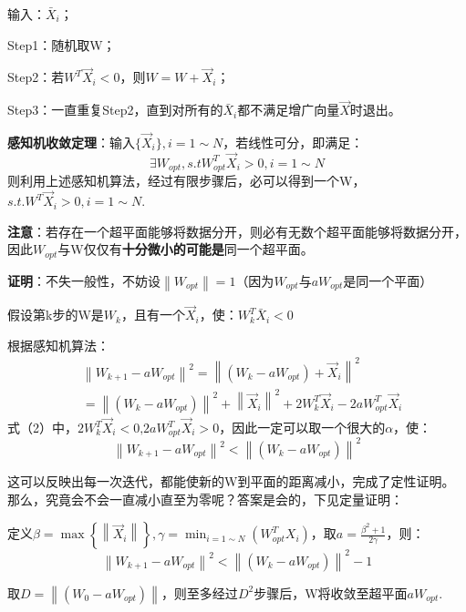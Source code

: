 输入：$\bar{X}_i$；

Step1：随机取W；

Step2：若$W^T\vec{X}_i<0$，则$W=W+\vec{X}_i$；

Step3：一直重复Step2，直到对所有的$\bar{X}_i$都不满足增广向量$\vec{X}$时退出。

\textbf{感知机收敛定理}：输入$\{\vec{X}_i\},i=1\sim N$，若线性可分，即满足：
\setcounter{equation}{0} %
\begin{equation}\exists W_{opt},s.tW_{opt}^T\vec{X}_i>0,i=1\sim N\end{equation}
则利用上述感知机算法，经过有限步骤后，必可以得到一个W，$s.t.W^T\vec{X}_i>0,i=1\sim N$.

\textbf{注意}：若存在一个超平面能够将数据分开，则必有无数个超平面能够将数据分开，因此$W_{opt}$与W仅仅有\textbf{十分微小的可能是}同一个超平面。

\textbf{证明}：不失一般性，不妨设$\left\|W_{opt}\right\|=1$（因为$W_{opt}\text{与}aW_{opt}$是同一个平面）

假设第k步的W是$W_{k}$，且有一个$\vec{X}_i$，使：$W_k^T\bar{X}_i<0$

根据感知机算法：
\begin{equation}\begin{aligned}&\left\|W_{k+1}-aW_{opt}\right\|^2=\left\|(W_k-aW_{opt})+\vec{X}_i\right\|^2\\&=\left\|(W_k-aW_{opt})\right\|^2+\left\|\vec{X}_i\right\|^2+2W_k^T\vec{X}_i-2aW_{opt}^T\vec{X}_i\end{aligned}\end{equation}
式（2）中，$2W_k^T\vec{X}_i<0\text{,2}aW_{opt}^T\vec{X}_i>0$，因此一定可以取一个很大的$\alpha$，使：
\begin{equation}\left\|W_{k+1}-aW_{opt}\right\|^2<\left\|(W_{k}-aW_{opt})\right\|^2\end{equation}

这可以反映出每一次迭代，都能使新的W到平面的距离减小，完成了定性证明。那么，究竟会不会一直减小直至为零呢？答案是会的，下见定量证明：

定义$\beta=\max\left\{\left\|\vec{X}_i\right\|\right\},\gamma=\min_{i=1\sim N}(W_{opt}^TX_i)$，取$a=\frac{\beta^2+1}{2\gamma}$，则：
\begin{equation}\left\|W_{k+1}-aW_{opt}\right\|^2<\left\|(W_{k}-aW_{opt})\right\|^2-1\end{equation}

取$D=\left\|(W_0-aW_{opt})\right\|$，则至多经过$D^{2}$步骤后，W将收敛至超平面$aW_{opt}$.

